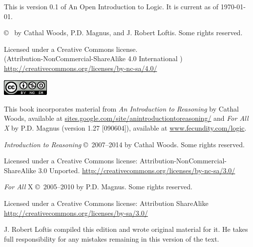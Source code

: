 \thispagestyle{empty}%
This is version 0.1 of An Open Introduction to Logic. It is current as of \today. %

\vfill

{\copyright\  by Cathal Woods, P.D. Magnus, and J. Robert Loftis. Some rights reserved. }

\begin{adjustwidth}{2em}{0em}
{\footnotesize Licensed under a Creative Commons license.\\
	(Attribution-NonCommercial-ShareAlike 4.0 International )
	\url{http://creativecommons.org/licenses/by-nc-sa/4.0/}


\includegraphics[width=66pt, height=23pt, keepaspectratio=true]{img/cc-by-nc-sa.png}

}
\end{adjustwidth}

\vfill

This book incorporates material from \emph{An Introduction to Reasoning} by Cathal Woods, available at \url{sites.google.com/site/anintroductiontoreasoning/}
and \emph{For All X} by P.D. Magnus (version 1.27 [090604]), available at \url{www.fecundity.com/logic}.


\textit{Introduction to Reasoning} \copyright\ 2007--2014 by Cathal Woods. Some rights reserved.

\begin{adjustwidth}{2em}{0em}
{\footnotesize Licensed under a Creative Commons license: Attribution-NonCommercial-ShareAlike 3.0 Unported. \url{http://creativecommons.org/licenses/by-nc-sa/3.0/}}
\end{adjustwidth}

\textit{For All} X \copyright\  2005--2010 by P.D. Magnus. Some rights reserved.

\begin{adjustwidth}{2em}{0em}
{\footnotesize Licensed under a Creative Commons license: Attribution ShareAlike \url{http://creativecommons.org/licenses/by-sa/3.0/}}
\end{adjustwidth}

\vfill

J. Robert Loftis compiled this edition and wrote original material for it. He takes full responsibility for any mistakes remaining in this version of the text.


